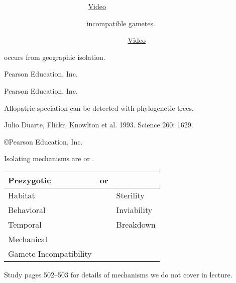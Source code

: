 \documentclass[t]{beamer}
\begin{document}
%
{
\begin{frame}[b]{}
	\hfill \tiny  \textcolor{white}{Vince Smith, Wikimedia, . \href{https://www.youtube.com/watch?v=z922by9_6Fw}{Video} }
\end{frame}
}
%
{
\begin{frame}[b]{\textcolor{white}{Many marine species have} \textcolor{orange5}{incompatible gametes.}}

	\hfill \tiny \textcolor{white}{Emma Hickerson, \textsc{noaa}, public domain. \href{https://www.youtube.com/watch?v=wsaZ8-I7akg}{Video}}

\end{frame}
}
%
{
\begin{frame}[b]{ occurs from geographic isolation.}

	\hfill \tiny \textcopyright Pearson Education, Inc.

\end{frame}
}
%
{
\begin{frame}[b]

	\hfill \tiny \textcopyright Pearson Education, Inc.

\end{frame}
}
%
{
\begin{frame}[b]{Allopatric speciation can be detected with phylogenetic trees.}

	\tiny  Julio Duarte, Flickr,  \hfill Knowlton et al. 1993. Science 260: 1629.

\end{frame}
}
%
{
\begin{frame}[b]

	\tiny  \copyright Pearson Education, Inc.

\end{frame}
}
%
\begin{frame}{Isolating mechanisms are  or .}
	\vspace{2\baselineskip}
	\centering
	\begin{tabular}{l l l}
		\toprule
		{\large Prezygotic}	& or &	{\large \highlight{Postzygotic}}\\
		\midrule
		Habitat	& & Sterility \\
		Behavioral & &	Inviability \\
		Temporal	& &	Breakdown \\
		Mechanical 	& & 	\\
		Gamete Incompatibility	& & \\
		\bottomrule
	\end{tabular}

	\hangpara Study pages 502--503 for details of mechanisms we do not cover in lecture.
\end{frame}
\end{document}
